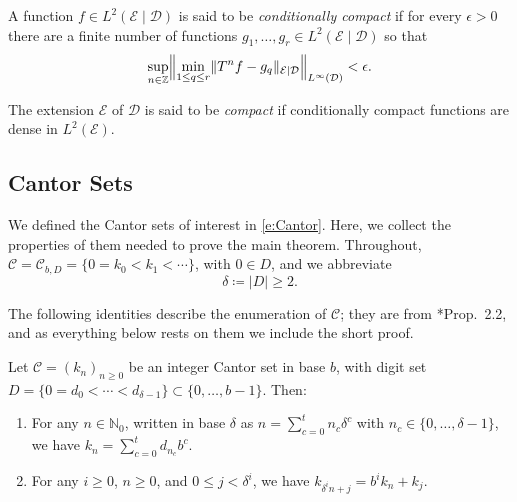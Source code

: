 \begin{definition}
    A function $f\in L^2 (\mathcal E \mid \mathcal D) $ is said to be \emph{conditionally compact} if for every $\epsilon>0$ there 
    are a finite number of functions $g_1 ,\ldots,g_r \in L^2(\mathcal E\mid \mathcal D)$ so that 
    \begin{equation}
        \sup_{n\in \mathbb Z}
        \Bigl\lVert
        \min_{1\leq q\leq r}
        \lVert T^n f - g_q \rVert_{\mathcal E\mid  \mathcal D}
        \Bigr\rVert_{L^\infty (\mathcal { D})} < \epsilon.
    \end{equation}

    
    The extension $\mathcal E$ of $\mathcal D$ is said to be \emph{compact} if conditionally compact functions  are dense in  $L^2 (\mathcal E) $.  
\end{definition}








\subsection{Cantor Sets} 

We defined the Cantor sets of interest in \eqref{e:Cantor}. Here, we collect the properties of them needed to prove the main theorem.  
Throughout, $\mathcal C = \mathcal C_{b,D} = \{0=k_0<k_1 < \cdots\}$, with $0 \in D$, and we abbreviate 
\begin{equation} \label{e:delta}
\delta \coloneqq \lvert D\rvert \geq 2 . 
\end{equation}

The following identities describe the enumeration of $\mathcal C$; they are from \cite{firstpaper}*{Prop.~2.2}, 
and as everything below rests on them we include the short proof.  

\begin{lemma} \label{l:Diff}
    Let $\mathcal C=(k_n)_{n\geq 0}$ be an integer Cantor set in base $b$, with digit set $D=\{0=d_0<\cdots <d_{\delta -1}\}\subset \{0,\ldots ,b-1\}$. Then: 
    \begin{enumerate}
        \item[(i)] For any $n\in \mathbb{N}_0$, written in base $\delta $ as $n=\sum_{c=0}^tn_c\delta ^c$ with $n_c\in \{0,\ldots ,\delta -1\}$, we have $k_n=\sum_{c=0}^td_{n_c}b^c$.  
        \item[(ii)] For any $i\geq 0$, $n\geq 0$, and $0\leq j<\delta ^i$, we have $k_{\delta ^in+j}=b^ik_n+k_j$. 
    \end{enumerate}
\end{lemma}

